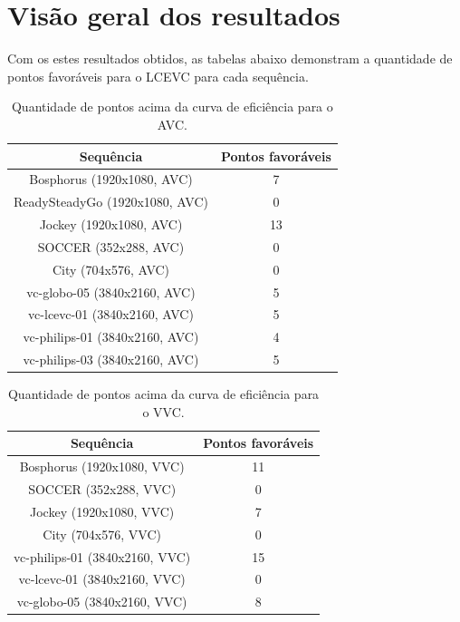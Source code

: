 \newpage
\section{Visão geral dos resultados}

Com os estes resultados obtidos, as tabelas abaixo demonstram a quantidade de pontos
favoráveis para o \acrshort{LCEVC} para cada sequência.

\begin{table}[h]
    \centering
    \begin{tabular}{|c|c|}
        \hline
        \textbf{Sequência} & \textbf{Pontos favoráveis}\\
        \hline
        Bosphorus (1920x1080, AVC) & 7\\
        \hline
        ReadySteadyGo (1920x1080, AVC) & 0\\
        \hline
        Jockey (1920x1080, AVC) & 13\\
        \hline
        SOCCER (352x288, AVC) & 0\\
        \hline
        City (704x576, AVC) & 0\\
        \hline
        vc-globo-05 (3840x2160, AVC) & 5\\
        \hline
        vc-lcevc-01 (3840x2160, AVC) & 5\\
        \hline
        vc-philips-01 (3840x2160, AVC) & 4\\
        \hline
        vc-philips-03 (3840x2160, AVC) & 5\\
        \hline
    \end{tabular}
    \caption{Quantidade de pontos acima da curva de eficiência para o AVC.}
    \label{tab:results-avc}
\end{table}

\begin{table}[h]
    \centering
    \begin{tabular}{|c|c|}
        \hline
        \textbf{Sequência} & \textbf{Pontos favoráveis}\\
        \hline
        Bosphorus (1920x1080, VVC) & 11\\
        \hline
        SOCCER (352x288, VVC) & 0\\
        \hline
        Jockey (1920x1080, VVC) & 7\\
        \hline
        City (704x576, VVC) & 0\\
        \hline
        vc-philips-01 (3840x2160, VVC) & 15\\
        \hline
        vc-lcevc-01 (3840x2160, VVC) & 0\\
        \hline
        vc-globo-05 (3840x2160, VVC) & 8\\
        \hline
    \end{tabular}
    \caption{Quantidade de pontos acima da curva de eficiência para o VVC.}
    \label{tab:results-vvc}
\end{table}

